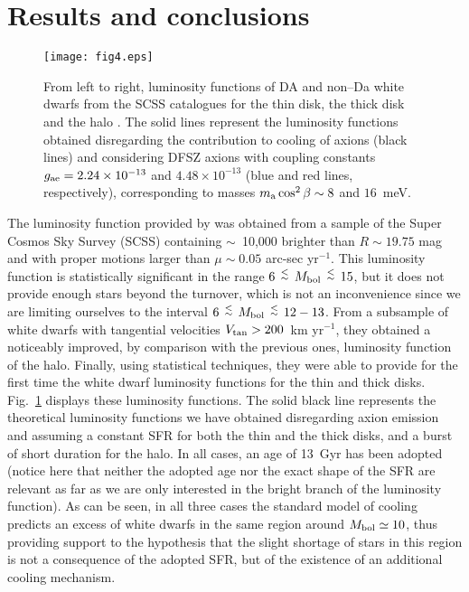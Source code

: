 \documentclass[useAMS,usenatbib]{mnras}
\newcommand{\lppr}{\stackrel{<}{\scriptstyle \sim}}
\begin{document}
\section{Results and conclusions}

\begin{figure*}
\centering
\texttt{[image: fig4.eps]}
\caption{From left  to right,  luminosity functions  of DA  and non--Da
  white dwarfs from  the SCSS catalogues for the thin  disk, the thick
  disk and  the halo  \citep{rowe11}.  The  solid lines  represent the
  luminosity  functions  obtained  disregarding  the  contribution  to
  cooling of  axions (black  lines) and  considering DFSZ  axions with
  coupling constants  $g_{\rm ae} =  2.24 \times 10^{-13}$ and  $ 4.48
  \times 10^{-13}$  (blue and red lines,  respectively), corresponding
  to masses $m_{\rm a} \cos^2 \beta \sim 8$ and $16$~meV.}
\label{fig4}
\end{figure*}


The luminosity function provided by \citet{rowe11} was obtained from a sample 
of the Super Cosmos Sky Survey (SCSS) containing $\sim$~10,000 brighter than $R \sim 19.75$ mag and with proper motions larger than $\mu \sim 0.05$ arc-sec yr$^{-1}$. This luminosity function is statistically significant in the range $6\, \lppr \, M_{\rm bol}\, \lppr\, 15$, but it does not provide  enough stars beyond the turnover, which is not an inconvenience since we are 
limiting ourselves to the interval $6\, \lppr \, M_{\rm bol}\, \lppr \, 12-13$. From a subsample of white dwarfs with tangential velocities $V_{\rm tan} > 200$~km yr$^{-1}$, they obtained a noticeably improved, by comparison with the previous ones, luminosity function of the halo. Finally, using statistical techniques, they were able to provide for the first time the white dwarf luminosity functions for the thin and thick disks.   Fig.~\ref{fig4} displays  these
luminosity functions.  The solid black line represents the theoretical
luminosity functions we have obtained disregarding axion emission and assuming
a constant SFR for  both the thin and the thick disks,  and a burst of short
duration for the halo.  In all  cases, an age of 13~Gyr has been
adopted (notice here that neither the adopted age nor the exact shape of the SFR are  relevant as far as we are only interested in the  bright branch of the luminosity  function).  As can
be seen, in all three cases  the standard model of cooling predicts an
excess of white dwarfs in the  same region around $M_{\rm bol} \simeq
10$, thus providing support to the hypothesis that the slight shortage
of stars in this  region is not a consequence of  the adopted SFR, but
of the existence of an additional cooling mechanism.
\end{document}
